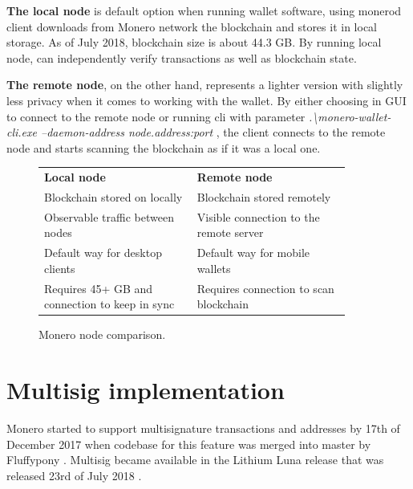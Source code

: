 \documentclass[
  printed, %
  table,   %
  nolof,     %
  nolot,     %
           oneside, color
]{fithesis3}
\begin{document}
\textbf{The local node} is default option when running wallet software, using monerod client downloads from Monero network the blockchain and stores it in local storage. As of July 2018, blockchain size is about 44.3 GB. By running local node, can independently verify transactions as well as blockchain state.

\textbf{The remote node}, on the other hand, represents a lighter version with slightly less privacy when it comes to working with the wallet. By either choosing in GUI to connect to the remote node or running cli with parameter \textit{.\textbackslash monero-wallet-cli.exe --daemon-address node.address:port} , the client connects to the remote node and starts scanning the blockchain as if it was a local one.

\begin{figure}[H]
\center
\begin{tabular}{p{0.45\linewidth}p{0.45\linewidth}}
\textbf{Local node}                                                          & \textbf{Remote node}                                \\
Blockchain stored on locally                                           & Blockchain stored remotely                          \\
Observable traffic between nodes                                             & Visible connection to the remote server                 \\
Default way for desktop clients                                              & Default way for mobile wallets \\
Requires 45+ GB and connection to keep in sync                               & Requires connection to scan blockchain             
\end{tabular}
\caption{Monero node comparison.}
\label{table:moneronodes}
\end{figure}
\newpage
\section{Multisig implementation}

Monero started to support multisignature transactions and addresses by 17th of December 2017 when codebase for this feature was merged into master by Fluffypony \cite{moneromultisig}. Multisig became available in the Lithium Luna release that was released 23rd of July 2018 \cite{moneromultisigrelease}.
\end{document}
